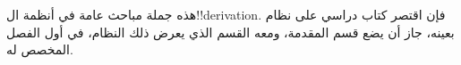 \documentclass[../../../include/open-logic-chapter]{subfiles}
\begin{document}
      {}
      {}

\begin{editorial}
هذه جملة مباحث عامة في أنظمة ال!!{derivation}. فإن اقتصر كتاب دراسي على نظام بعينه، جاز أن يضع قسم المقدمة، ومعه القسم الذي يعرض ذلك النظام، في أول الفصل المخصص له.
\end{editorial}






\OLEndChapterHook
\end{document}

